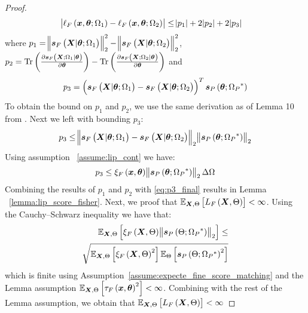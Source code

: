 \begin{proof}
    \begin{align}
        &\abs{\ell_F\left(\bm{x},\bm{\theta};\Omega_1\right)-\ell_F\left(\bm{x},\bm{\theta};\Omega_2\right)}\leq \abs{p_1}+2\abs{p_2}+2\abs{p_3}\nonumber
    \end{align}
    where $p_1=\norm{\lscore{{\X}}{\p;\Omega_1}}_2^2-\norm{\lscore{{\X}}{\p;\Omega_2}}_2^2$, $p_2=\trace{\frac{\partial \lscore{{\X;\Omega_1}}{\p}}{\partial\p}}-\trace{\frac{\partial \lscore{{\X;\Omega_2}}{\p}}{\partial\p}}$ and
    \begin{equation*}
        p_3= \brackets{\lscore{{\X}}{\p;\Omega_1}-\lscore{{\X}}{\p;\Omega_2}}^T\priorscore{\p;\paramp{^*}}
    \end{equation*}
    To obtain the bound on $p_1$ and $p_2$, we use the same derivation as of Lemma 10 from \cite{crafts2023bayesian}. Next we left with bounding $p_3$:
    \begin{align*}
        p_3\leq \norm{\lscore{{\X}}{\p;\Omega_1}-\lscore{{\X}}{\p;\Omega_2}}_2\norm{\priorscore{\p;\paramp{^*}}}_2
    \end{align*}
    Using assumption ~\ref{assume:lip_cont} we have:
    \begin{align}\label{eq:p3_final}
        p_3\leq \xi_F\left(\bm{x},\bm{\theta}\right)\norm{\bm{s}_{P}\left(\bm{\theta};\Omega_{P}{^*}\right)}_2\Delta\Omega
    \end{align}
    Combining the results of $p_1$ and $p_2$ with \eqref{eq:p3_final} results in Lemma ~\ref{lemma:lip_score_fisher}.
    Next, we proof that $\expectation{L_F\brackets{\X,\pr}}{\X,\pr}<\infty$. Using the Cauchy–Schwarz inequality we have that:
    \begin{align}
        \expectation{\xi_F\brackets{\X,\pr}\norm{\priorscore{\pr;\paramp{^*}}}_2}{\X,\pr}\leq \nonumber\\
        \sqrt{\expectation{\xi_F\brackets{\X,\pr}^2}{\X,\pr}\expectation{\priorscore{\pr;\paramp{^*}}^2}{\pr}}
    \end{align}
    which is finite using Assumption~\ref{assume:expecte_fine_score_matching} and the Lemma assumption $\expectation{\tau_F\brackets{\x,\p}^2}{\X,\pr}<\infty$. Combining with the rest of the Lemma assumption, we obtain that $\expectation{L_F\brackets{\X,\pr}}{\X,\pr}<\infty$
    
    
\end{proof}

